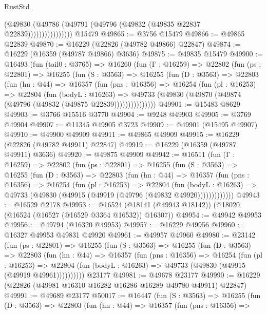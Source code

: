 \begin{lexlean}{RustStd}
\begin{coremodule}
                        (@49830
                          (@49786 (@49791 (@49796 (@49832 (@49835 @22837 @22839))))))))))))))))
    @15479
@49865 := @3756 @15479
@49866 := @49865 @22839
@49870 := @16229 (@22826 (@49782 @49866) @22847)
@49874 := @16229 (@16359 (@49787 @49866) @3636)
@49875 := @49835 @15479
@49900 := @16493
    (fun (tail0 : @3765) =>
    @16260
      (fun (Γ : @16259) =>
      @22802
        (fun (ps : @22801) =>
        @16255
          (fun (S : @3563) =>
          @16255
            (fun (D : @3563) =>
            @22803
              (fun (hn : @44) =>
              @16357
                (fun (pns : @16356) =>
                @16254
                  (fun (pl : @16253) =>
                  @22804
                    (fun (bodyL : @16263) =>
                    @49733 (@49830 (@49870 (@49874 (@49796 (@49832 (@49875 @22839)))))))))))))))
@49901 := @15483 @8629
@49903 := @3766 @15516 @3770
@49904 := @9248 @49903
@49905 := @3769 @49904
@49907 := @11345 @49905 @3723
@49909 := @49901 (@15495 @49907)
@49910 := @49900 @49909
@49911 := @49865 @49909
@49915 := @16229 (@22826 (@49782 @49911) @22847)
@49919 := @16229 (@16359 (@49787 @49911) @3636)
@49920 := @49875 @49909
@49942 := @16511
    (fun (Γ : @16259) =>
    @22802
      (fun (ps : @22801) =>
      @16255
        (fun (S : @3563) =>
        @16255
          (fun (D : @3563) =>
          @22803
            (fun (hn : @44) =>
            @16357
              (fun (pns : @16356) =>
              @16254
                (fun (pl : @16253) =>
                @22804
                  (fun (bodyL : @16263) =>
                  @49733 (@49830 (@49915 (@49919 (@49796 (@49832 @49920)))))))))))))
@49943 := @16529 @2178
@49953 := @16524 (@18141 (@49943 @18142)) (@18020 (@16524 (@16527 (@16529 @3364 @16532)) @16307))
@49954 := @49942 @49953
@49956 := @49794 (@16320 @49953)
@49957 := @16229 @49956
@49960 := @16327 @49953 @49831 @49920
@49961 := @49957 @49960
@49980 := @23142
    (fun (ps : @22801) =>
    @16255
      (fun (S : @3563) =>
      @16255
        (fun (D : @3563) =>
        @22803
          (fun (hn : @44) =>
          @16357
            (fun (pns : @16356) =>
            @16254
              (fun (pl : @16253) =>
              @22804 (fun (bodyL : @16263) => @49733 (@49830 (@49915 (@49919 @49961))))))))))
    @23177
@49981 := @49678 @23177
@49990 := @16229 (@22826 (@49981 @16310 @16282 @16286 @16289 @49780 @49911) @22847)
@49991 := @49689 @23177
@50017 := @16447
    (fun (S : @3563) =>
    @16255
      (fun (D : @3563) =>
      @22803
        (fun (hn : @44) =>
        @16357
          (fun (pns : @16356) =>

\end{coremodule}
\end{lexlean}
